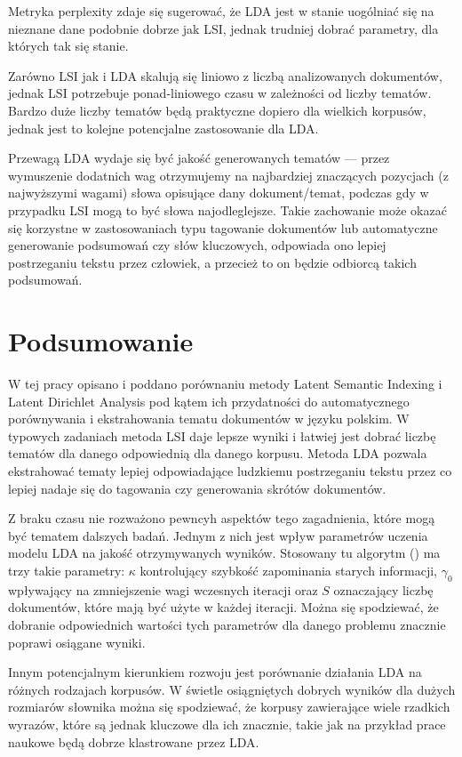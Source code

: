 \documentclass[11pt,a4paper]{article}
\begin{document}
Metryka perplexity zdaje się sugerować, że LDA jest w stanie uogólniać się na
nieznane dane podobnie dobrze jak LSI, jednak trudniej dobrać parametry, dla
których tak się stanie.

Zarówno LSI jak i LDA skalują się liniowo z liczbą analizowanych dokumentów,
jednak LSI potrzebuje ponad-liniowego czasu w zależności od liczby tematów.
Bardzo duże liczby tematów będą praktyczne dopiero dla wielkich korpusów,
jednak jest to kolejne potencjalne zastosowanie dla LDA.

Przewagą LDA wydaje się być jakość generowanych tematów --- przez wymuszenie
dodatnich wag otrzymujemy na najbardziej znaczących pozycjach (z najwyższymi
wagami) słowa opisujące dany dokument/temat, podczas gdy w przypadku LSI mogą
to być słowa najodleglejsze. Takie zachowanie może okazać się korzystne w
zastosowaniach typu tagowanie dokumentów lub automatyczne generowanie
podsumowań czy słów kluczowych, odpowiada ono lepiej postrzeganiu tekstu przez
człowiek, a przecież to on będzie odbiorcą takich podsumowań.

\pagebreak

\section{Podsumowanie}

W tej pracy opisano i poddano porównaniu metody Latent Semantic Indexing i
Latent Dirichlet Analysis pod kątem ich przydatności do automatycznego
porównywania i ekstrahowania tematu dokumentów w języku polskim. W typowych
zadaniach metoda LSI daje lepsze wyniki i łatwiej jest dobrać liczbę tematów
dla danego odpowiednią dla danego korpusu. Metoda LDA pozwala ekstrahować
tematy lepiej odpowiadające ludzkiemu postrzeganiu tekstu przez co lepiej
nadaje się do tagowania czy generowania skrótów dokumentów.

Z braku czasu nie rozważono pewncyh aspektów tego zagadnienia, które mogą być
tematem dalszych badań. Jednym z nich jest wpływ parametrów uczenia modelu LDA
na jakość otrzymywanych wyników. Stosowany tu algorytm
(\cite{gensim-algorithm}) ma trzy takie parametry: $\kappa$ kontrolujący
szybkość zapominania starych informacji, $\gamma_0$ wpływający na zmniejszenie
wagi wczesnych iteracji oraz $S$ oznaczający liczbę dokumentów, które mają być
użyte w każdej iteracji. Można się spodziewać, że dobranie odpowiednich
wartości tych parametrów dla danego problemu znacznie poprawi osiągane wyniki.

Innym potencjalnym kierunkiem rozwoju jest porównanie działania LDA na różnych
rodzajach korpusów. W świetle osiągniętych dobrych wyników dla dużych rozmiarów
słownika można się spodziewać, że korpusy zawierające wiele rzadkich wyrazów,
które są jednak kluczowe dla ich znacznie, takie jak na przykład prace naukowe
będą dobrze klastrowane przez LDA.
\end{document}
